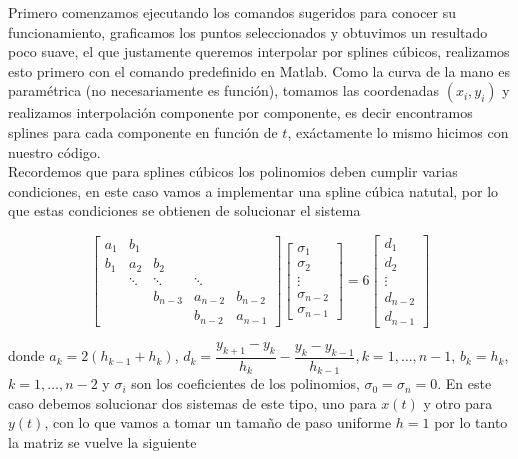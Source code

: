 \begin{solution}
    Primero comenzamos ejecutando los comandos sugeridos para conocer su funcionamiento, graficamos los puntos seleccionados y obtuvimos un resultado poco suave, el que justamente  queremos interpolar por splines cúbicos, realizamos esto primero con el comando predefinido en Matlab. Como la curva de la mano es paramétrica (no necesariamente es función), tomamos las coordenadas $(x_i,y_i)$ y realizamos interpolación componente por componente, es decir encontramos splines para cada componente en función de $t$, exáctamente lo  mismo hicimos con nuestro código.\\

    Recordemos que para splines cúbicos los polinomios deben cumplir varias condiciones, en este caso vamos a implementar una spline cúbica natutal, por lo que estas condiciones se obtienen de solucionar el sistema 

    $$\left[\begin{array}{ccccc}
a_1 & b_1 & & & \\
b_1 & a_2 & b_2 & & \\
& \ddots & \ddots & \ddots & \\
& & b_{n-3} & a_{n-2} & b_{n-2} \\
& & & b_{n-2} & a_{n-1}
\end{array}\right]\left[\begin{array}{c}
\sigma_1 \\
\sigma_2 \\
\vdots \\
\sigma_{n-2} \\
\sigma_{n-1}
\end{array}\right]=6\left[\begin{array}{c}
d_1 \\
d_2 \\
\vdots \\
d_{n-2} \\
d_{n-1}
\end{array}\right]$$

donde $a_k=2(h_{k-1}+h_k)$, $d_k=\dfrac{y_{k+1}-y_k}{h_k}-\dfrac{y_k-y_{k-1}}{h_{k-1}}, k=1,\ldots,n-1$, $b_k=h_k$, $k=1,\ldots,n-2$ y $\sigma_i$ son los coeficientes de los polinomios, $\sigma_0=\sigma_n=0$. En este caso debemos solucionar dos  sistemas de este tipo, uno para $x(t)$ y otro para $y(t)$, con lo que vamos a tomar un tamaño de paso uniforme $h=1$ por lo tanto la matriz se vuelve la siguiente\\


\end{solution}
